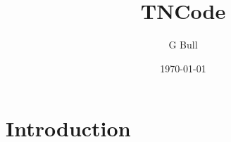 \documentclass[10pt,a4paper]{book}
\begin{document}
\author{G Bull} %
\title{TNCode} %
\date{\today{}} %
\maketitle{} %
\tableofcontents{}

\section{Introduction}
\end{document}
